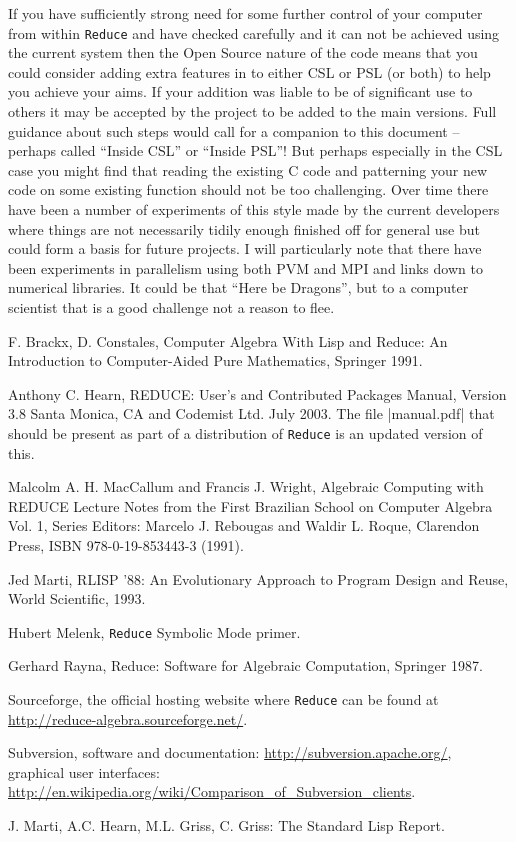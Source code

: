 \documentclass[12pt,twoside,openright]{memoir}
\newcommand{\reduce}{\texttt{Reduce}\xspace}
\begin{document}
If you have sufficiently strong need for some further control of your computer
from within \reduce and have checked carefully and it can not be achieved using
the current system then the Open Source nature of the code means that you could
consider adding extra features in to either CSL or PSL (or both) to help you
achieve your aims. If your addition was liable to be of significant use to
others it may be accepted by the project to be added to the main versions. Full
guidance about such steps would call for a companion to this document --
perhaps called ``Inside CSL'' or ``Inside PSL''! But perhaps especially in the
CSL case you might find that reading the existing C code and patterning your
new code on some existing function should not be too challenging. Over time
there have been a number of experiments of this style made by the current
developers where things are not necessarily tidily enough finished off for
general use but could form a basis for future projects. I will particularly
note that there have been experiments in parallelism using both PVM and MPI and
links down to numerical libraries. It could be that ``Here be Dragons'', but to
a computer scientist that is a good challenge not a reason to flee.


\begin{thebibliography}{99}
 F. Brackx, D. Constales, Computer Algebra With Lisp and Reduce: An
  Introduction to Computer-Aided Pure Mathematics, Springer 1991.

 Anthony C. Hearn, REDUCE: User's and Contributed Packages Manual,
  Version 3.8 Santa Monica, CA and Codemist Ltd.  July 2003. The file
  |manual.pdf| that should be present as part of a distribution of
  \reduce is an updated version of this.

 Malcolm A. H. MacCallum and Francis J. Wright, Algebraic
  Computing with REDUCE Lecture Notes from the First Brazilian School on
  Computer Algebra Vol. 1, Series Editors: Marcelo J. Rebougas and Waldir
  L. Roque, Clarendon Press, ISBN 978-0-19-853443-3 (1991).

 Jed Marti, RLISP '88: An Evolutionary Approach to Program
  Design and Reuse, World Scientific, 1993.

 Hubert Melenk, \reduce Symbolic Mode primer.
  
 Gerhard Rayna, Reduce: Software for Algebraic Computation,
  Springer 1987.

 Sourceforge, the official hosting website where \reduce
  can be found at \url{http://reduce-algebra.sourceforge.net/}.

 Subversion, software and documentation:
  \url{http://subversion.apache.org/}, graphical user interfaces:
  \url{http://en.wikipedia.org/wiki/Comparison_of_Subversion_clients}.

 J. Marti, A.C. Hearn, M.L. Griss, C. Griss: The Standard Lisp
  Report.

\end{thebibliography}
\end{document}
